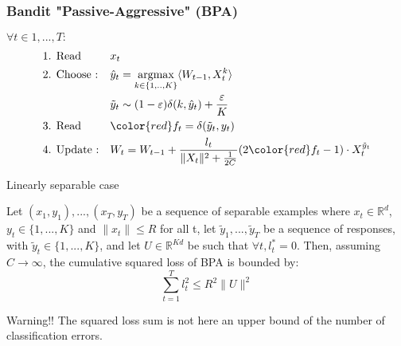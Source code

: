 \documentclass{beamer}
\begin{document}
\begin{frame}
	\frametitle{Bandit "Passive-Aggressive"  (BPA)}
%		
	
	\begin{block}{}
		$\forall t \in 1,...,T :$
		\begin{align*}
		&\text{1. Read } 
		&& x_t 
		\\
		&\text{2. Choose :} 
		&& \hat{y}_t = \underset{k \in\{1,..,K\}}{\text{argmax}}  \langle W_{t-1}, X_t^k \rangle 
		\\
		& %
		&& \tilde{y}_t \sim (1-\varepsilon) \delta(k,\hat{y}_t) + \frac{\varepsilon}{K} 
		\\	
		&\text{3. Read } 
		&& {\color{red} f_t = \delta(\tilde{y}_t ,y_t)}  
		\\
		&\text{4. Update :} 
		&& W_t = W_{t-1} + \frac{l_t}{\|X_t\|^2 + \frac{1}{2C}} (2{\color{red}f_t}-1)\cdot X_t^{\tilde{y}_t}
		\end{align*}
	\end{block}
	
\end{frame}

\begin{frame}{Linearly separable case}
	\begin{theorem}
		Let $(x_1,y_1),...,(x_T,y_T)$ be a sequence of separable examples where $x_t \in \mathbb{R}^d$, $y_t\in \{1,...,K\}$ and $\parallel x_t\parallel\leqslant R$ for all t, let $\tilde{y}_1,...,\tilde{y}_T$ be a sequence of responses, with $\tilde{y}_t\in \{1,...,K\}$, 
		and let $U \in \mathbb{R}^{K d}$ be such that $ \forall t, l^*_t=0$. Then, assuming $C \rightarrow \infty$, the cumulative squared loss of BPA is bounded by:
		\begin{equation}
		\sum_{t=1}^{T} l_t^2 \leqslant R^2 \parallel{U}\parallel^2
		\end{equation}
	\end{theorem}
	
	\begin{alertblock}{Warning!!}
		The squared loss sum is not here an upper bound of the number of classification errors.
	\end{alertblock}
\end{frame}
\end{document}
